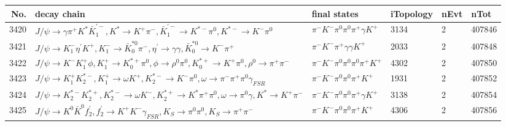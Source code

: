 \begin{table}[htbp] 
\begin{center}
\begin{small}
\begin{tabular}{rlllll}\hline\hline
 No. & decay chain & final states &  iTopology & nEvt & nTot \\\hline
3420&$J/\psi       \rightarrow \gamma       \pi^{+}        K^{*}          \bar{K}_1^{'-}, K^{*}           \rightarrow K^{+}          \pi^{-}        , \bar{K}_1^{'-} \rightarrow K^{*-}         \pi^{0}        , K^{*-}          \rightarrow K^{-}          \pi^{0}        $&$\pi^{-}        K^{-}          \pi^{0}        \pi^{0}        \pi^{+}        \gamma       K^{+}          $& 3134&    2&407846\\
3421&$J/\psi       \rightarrow K_{1}^{-}      \eta^{\prime} K^{+}          , K_{1}^{-}       \rightarrow \bar{K}_0^{*0}\pi^{-}        , \eta^{\prime}  \rightarrow \gamma       \gamma       , \bar{K}_0^{*0} \rightarrow K^{-}          \pi^{+}        $&$\pi^{-}        K^{-}          \pi^{+}        \gamma       \gamma       K^{+}          $& 2033&    2&407848\\
3422&$J/\psi       \rightarrow K^{-}          K_1^{+}        \phi           , K_1^{+}         \rightarrow K_{0}^{*+}     \pi^{0}        , \phi            \rightarrow \rho^{0}      \pi^{0}        , K_{0}^{*+}      \rightarrow K^{+}          \pi^{0}        , \rho^{0}       \rightarrow \pi^{+}        \pi^{-}        $&$\pi^{-}        K^{-}          \pi^{0}        \pi^{0}        \pi^{0}        \pi^{+}        K^{+}          $& 4302&    2&407850\\
3423&$J/\psi       \rightarrow K_1^{+}        K_2^{*-}       , K_1^{+}         \rightarrow \omega         K^{+}          , K_2^{*-}        \rightarrow K^{-}          \pi^{0}        , \omega          \rightarrow \pi^{-}        \pi^{+}        \pi^{0}        \gamma_{FSR} $&$\pi^{-}        K^{-}          \pi^{0}        \pi^{0}        \pi^{+}        K^{+}          $& 1931&    2&407852\\
3424&$J/\psi       \rightarrow K_2^{*-}       K_2^{*+}       , K_2^{*-}        \rightarrow \omega         K^{-}          , K_2^{*+}        \rightarrow K^{*}          \pi^{+}        \pi^{0}        , \omega          \rightarrow \pi^{0}        \gamma       , K^{*}           \rightarrow K^{+}          \pi^{-}        $&$\pi^{-}        K^{-}          \pi^{0}        \pi^{0}        \pi^{+}        \gamma       K^{+}          $& 3138&    2&407854\\
3425&$J/\psi       \rightarrow K^{0}          \bar{K}^{0}   f_2^{'}       , f_2^{'}        \rightarrow K^{+}          K^{-}          \gamma_{FSR} , K_{S}           \rightarrow \pi^{0}        \pi^{0}        , K_{S}           \rightarrow \pi^{+}        \pi^{-}        $&$\pi^{-}        K^{-}          \pi^{0}        \pi^{0}        \pi^{+}        K^{+}          $& 4306&    2&407856\\

\end{tabular}
\end{small}
\end{center}
\end{table}
